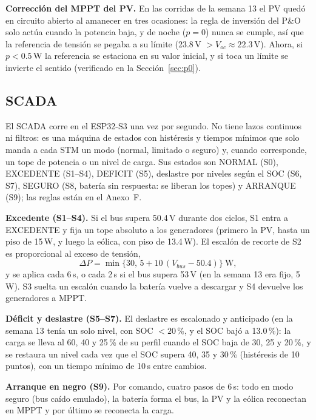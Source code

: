 \documentclass[conference]{IEEEtran}
\begin{document}
\textbf{Corrección del MPPT del PV.} En las corridas de la semana 13 el PV quedó en circuito abierto al amanecer en tres ocasiones: la regla de inversión del P\&O solo actúa cuando la potencia baja, y de noche ($p=0$) nunca se cumple, así que la referencia de tensión se pegaba a su límite (23.8\,V $>V_{oc}\approx22.3$\,V). Ahora, si $p<0.5$\,W la referencia se estaciona en su valor inicial, y si toca un límite se invierte el sentido (verificado en la Sección~\ref{sec:p0}).

\subsection{SCADA}

El SCADA corre en el ESP32-S3 una vez por segundo. No tiene lazos continuos ni filtros: es una máquina de estados con histéresis y tiempos mínimos que solo manda a cada STM un modo (normal, limitado o seguro) y, cuando corresponde, un tope de potencia o un nivel de carga. Sus estados son NORMAL (S0), EXCEDENTE (S1--S4), DEFICIT (S5), deslastre por niveles según el SOC (S6, S7), SEGURO (S8, batería sin respuesta: se liberan los topes) y ARRANQUE (S9); las reglas están en el Anexo~F.


\textbf{Excedente (S1--S4).} Si el bus supera 50.4\,V durante dos ciclos, S1 entra a EXCEDENTE y fija un tope absoluto a los generadores (primero la PV, hasta un piso de 15\,W, y luego la eólica, con piso de 13.4\,W). El escalón de recorte de S2 es proporcional al exceso de tensión,
\begin{equation}
\label{eq:dP}
\Delta P=\min\{30,\,5+10\,(V_{bus}-50.4)\}\ \text{W},
\end{equation}
y se aplica cada 6\,s, o cada 2\,s si el bus supera 53\,V (en la semana 13 era fijo, 5\,W). S3 suelta un escalón cuando la batería vuelve a descargar y S4 devuelve los generadores a MPPT.

\textbf{Déficit y deslastre (S5--S7).} El deslastre es escalonado y anticipado (en la semana 13 tenía un solo nivel, con SOC $<20$\,\%, y el SOC bajó a 13.0\,\%): la carga se lleva al 60, 40 y 25\,\% de su perfil cuando el SOC baja de 30, 25 y 20\,\%, y se restaura un nivel cada vez que el SOC supera 40, 35 y 30\,\% (histéresis de 10 puntos), con un tiempo mínimo de 10\,s entre cambios.

\textbf{Arranque en negro (S9).} Por comando, cuatro pasos de 6\,s: todo en modo seguro (bus caído emulado), la batería forma el bus, la PV y la eólica reconectan en MPPT y por último se reconecta la carga.
\end{document}
